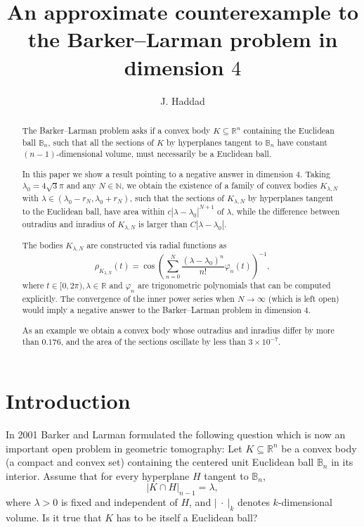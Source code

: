 \documentclass{amsart}
\title[The Barker--Larman problem in dimension $4$]{An approximate counterexample to the Barker--Larman problem in dimension $4$}
\author{J. Haddad}
\def \R{\mathbb R}
\def \B{\mathbb B}
\def \N{\mathbb N}
\newcommand \vol[2][3]{\left|#2\right|_{#1}}
\begin{document}
\begin{abstract}
	The Barker--Larman problem asks if a convex body $K \subseteq \R^n$ containing the Euclidean ball $\B_n$, such that all the sections of $K$ by hyperplanes tangent to $\B_n$ have constant $(n-1)$-dimensional volume, must necessarily be a Euclidean ball.

	In this paper we show a result pointing to a negative answer in dimension $4$.
	Taking $\lambda_0 = 4 \sqrt{3}\pi$ and any $N \in \N$, we obtain the existence of a family of convex bodies $K_{\lambda,N}$ with $\lambda \in (\lambda_0-r_N, \lambda_0 + r_N)$, such that the sections of $K_{\lambda,N}$ by hyperplanes tangent to the Euclidean ball, have area within $c |\lambda - \lambda_0|^{N+1}$ of $\lambda$, while the difference between outradius and inradius of $K_{\lambda,N}$ is larger than $C |\lambda - \lambda_0|$.

	The bodies $K_{\lambda,N}$ are constructed via radial functions as
	\[\rho_{K_{\lambda,N}}(t) = \cos\left( \sum_{n=0}^N \frac{(\lambda-\lambda_0)^n}{n!} \varphi_n(t) \right)^{-1},\]
	where $t \in [0,2\pi), \lambda \in \R$ and $\varphi_n$ are trigonometric polynomials that can be computed explicitly.
	The convergence of the inner power series when $N \to \infty$ (which is left open) would imply a negative answer to the Barker--Larman problem in dimension $4$.

	As an example we obtain a convex body whose outradius and inradius differ by more than $0.176$, and the area of the sections oscillate by less than $3 \times 10^{-7}$.
\end{abstract}
\maketitle
\section{Introduction}
\label{sec_intro}

In 2001 Barker and Larman formulated the following question which is now an important open problem in geometric tomography:
Let $K \subseteq \R^n$ be a convex body (a compact and convex set) containing the centered unit Euclidean ball $\B_n$ in its interior. Assume that for every hyperplane $H$ tangent to $\B_n$,
\begin{equation}
	\label{eq_equalsections}
	\vol[n-1]{K \cap H} = \lambda,
\end{equation}
where $\lambda > 0$ is fixed and independent of $H$, and $\vol[k]{ \ \cdot \ }$ denotes $k$-dimensional volume.
Is it true that $K$ has to be itself a Euclidean ball?
\end{document}
